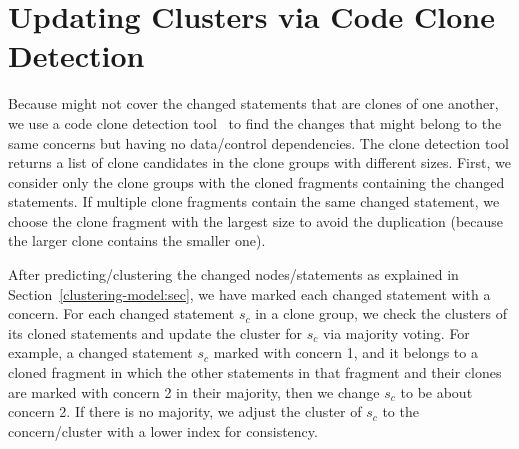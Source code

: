 \section{Updating Clusters via Code Clone Detection}
\label{sec:clone}

Because {\mvpdg} might not cover the changed statements that are
clones of one another, we use a code clone detection
tool~\cite{svajlenko2017fast} to find the changes that might belong to
the same concerns but having no data/control dependencies. The clone
detection tool returns a list of clone candidates in the clone groups
with different sizes. First, we consider only the clone groups with
the cloned fragments containing the changed statements. If multiple
clone fragments contain the same changed statement, we choose the
clone fragment with the largest size to avoid the duplication (because
the larger clone contains the smaller one).

After predicting/clustering the changed nodes/statements as explained
in Section~\ref{clustering-model:sec}, we have marked each changed
statement with a concern. For each changed statement $s_c$ in a clone
group, we check the clusters of its cloned statements and update the
cluster for $s_c$ via majority voting. For example, a changed
statement $s_c$ marked with concern 1, and it belongs to a cloned
fragment in which the other statements in that fragment and their
clones are marked with concern 2 in their majority, then we change $s_c$
to be about concern 2. If there is no majority, we adjust the cluster
of $s_c$ to the concern/cluster with a lower index for consistency.



